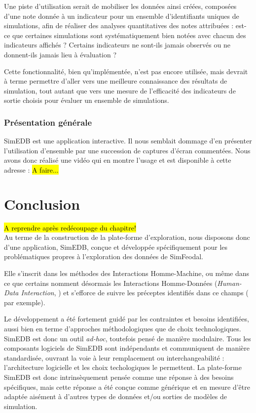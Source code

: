 Une piste d'utilisation serait de mobiliser les données ainsi créées, composées d'une note donnée à un indicateur pour un ensemble d'identifiants uniques de simulations, afin de réaliser des analyses quantitatives des notes attribuées : est-ce que certaines simulations sont systématiquement bien notées avec chacun des indicateurs affichés ? Certains indicateurs ne sont-ils jamais observés ou ne donnent-ils jamais lieu à évaluation ?

Cette fonctionnalité, bien qu'implémentée, n'est pas encore utilisée, mais devrait à terme permettre d'aller vers une meilleure connaissance des résultats de simulation, tout autant que vers une mesure de l'efficacité des indicateurs de sortie choisis pour évaluer un ensemble de simulations.

\subsubsection{Présentation générale}

SimEDB est une application interactive.
Il nous semblait dommage d'en présenter l'utilisation d'ensemble par une succession de captures d'écran commentées.
Nous avons donc réalisé une vidéo qui en montre l'usage et est disponible à cette adresse : \hl{A faire...}

\clearpage
\section*{Conclusion}

\hl{A reprendre après redécoupage du chapitre!}\\
Au terme de la construction de la plate-forme d'exploration, nous disposons donc d'une application, SimEDB, conçue et développée spécifiquement pour les problématiques propres à l'exploration des données de SimFeodal.

Elle s'inscrit dans les méthodes des Interactions Homme-Machine, ou même dans ce que certains nomment désormais les \og Interactions Homme-Données\fg{} (\og \textit{Human-Data Interaction}\fg{}, \cite{elmqvist_embodied_2011,mortier_human-data_2014}) et s'efforce de suivre les préceptes identifiés dans ce champs (\cite[167-170]{amirpour_amraii_human-data_2018} par exemple).

Le développement a été fortement guidé par les contraintes et besoins identifiées, aussi bien en terme d'approches méthodologiques que de choix technologiques.
SimEDB est donc un outil \textit{ad-hoc}, toutefois pensé de manière modulaire.
Tous les composants logiciels de SimEDB sont indépendants et communiquent de manière standardisée, ouvrant la voie à leur remplacement ou \og interchangeabilité\fg{} : l'architecture logicielle et les choix techologiques le permettent.
La plate-forme SimEDB est donc intrinsèquement pensée comme une réponse à des besoins spécifiques, mais cette réponse a été conçue comme générique et en mesure d'être adaptée aisément à d'autres types de données et/ou sorties de modèles de simulation.

